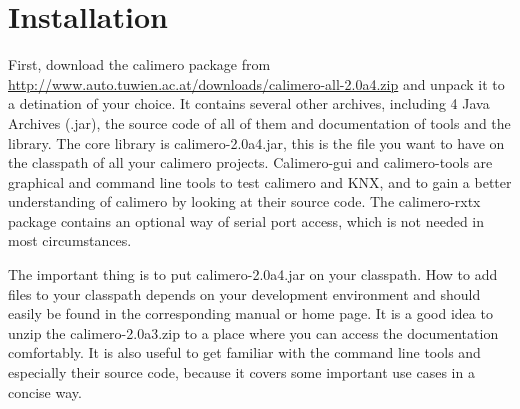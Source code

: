 \chapter{Installation}

First, download the calimero package from \url{http://www.auto.tuwien.ac.at/downloads/calimero-all-2.0a4.zip} and unpack it to a detination of your choice. It contains several other archives, including 4 Java Archives (.jar), the source code of all of them and documentation of tools and the library. The core library is calimero-2.0a4.jar, this is the file you want to have on the classpath of all your calimero projects. Calimero-gui and calimero-tools are graphical and command line tools to test calimero and KNX, and to gain a better understanding of calimero by looking at their source code. The calimero-rxtx package contains an optional way of serial port access, which is not needed in most circumstances.

The important thing is to put calimero-2.0a4.jar on your classpath. How to add files to your classpath depends on your development environment and should easily be found in the corresponding manual or home page. It is a good idea to unzip the calimero-2.0a3.zip to a place where you can access the documentation comfortably. It is also useful to get familiar with the command line tools and especially their source code, because it covers some important use cases in a concise way.
